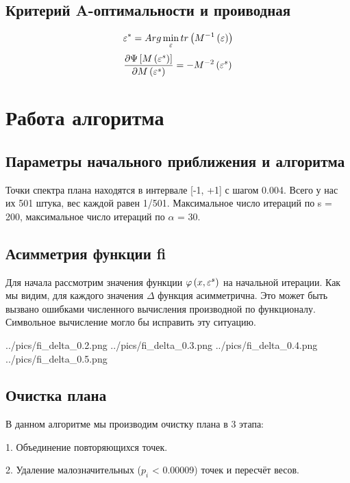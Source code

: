 \subsection{Критерий A-оптимальности и проиводная}
\[ \varepsilon^* = Arg \min_\varepsilon tr \left( M^{-1} \left( \varepsilon \right)  \right) \]
\[ \frac{\partial \Psi \left[  M\left( \varepsilon^s \right)  \right] }
{\partial M\left( \varepsilon^s \right)} = - M^{-2} \left( \varepsilon^s \right) \]



\section{Работа алгоритма}

\subsection{Параметры начального приближения и алгоритма}

Точки спектра плана находятся в интервале [-1, +1] с шагом 0.004. 
Всего у нас их 501 штука, вес каждой равен 1/501. 
Максимальное число итераций по s = 200, максимальное число итераций по $\alpha$ = 30.

\subsection{Асимметрия функции fi}

Для начала рассмотрим значения функции $\varphi \left( x, \varepsilon^s \right)$ на начальной итерации.
Как мы видим, для каждого значения $\Delta$ функция асимметрична. Это может быть вызвано 
ошибками численного вычисления производной по функционалу. Символьное вычисление могло бы исправить эту ситуацию.

{../pics/fi_delta_0.2.png}
{../pics/fi_delta_0.3.png}
{../pics/fi_delta_0.4.png}
{../pics/fi_delta_0.5.png}


\subsection{Очистка плана}

В данном алгоритме мы производим очистку плана в 3 этапа:

1. Объединение повторяющихся точек.

2. Удаление малозначительных ($p_i$ < 0.00009) точек и пересчёт весов.

